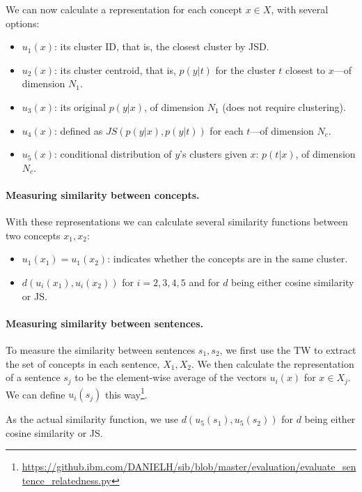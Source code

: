 \documentclass{article}
\begin{document}
    We can now calculate a representation for each concept $x\in X$,
    with several options:
    \begin{itemize}
        \item $u_1(x)$: its cluster ID, that is, the closest cluster by JSD.
        \item $u_2(x)$: its cluster centroid, that is, $p(y|t)$ for the cluster
        $t$ closest to $x$---of dimension $N_1$.
        \item $u_3(x)$: its original $p(y|x)$, of dimension $N_1$ (does not require clustering).
        \item $u_4(x)$: defined as $JS(p(y|x),p(y|t))$ for each $t$---of dimension $N_c$.
        \item $u_5(x)$: conditional distribution of $y$'s clusters given $x$: $p(t|x)$,
        of dimension $N_c$.
    \end{itemize}

    \paragraph{Measuring similarity between concepts.}

    With these representations we can calculate several similarity functions
    between two concepts $x_1,x_2$:
    \begin{itemize}
        \item $u_1(x_1)=u_1(x_2)$:
        indicates whether the concepts are in the same cluster.
        \item $d(u_i(x_1),u_i(x_2))$ for $i=2,3,4,5$ and for $d$ being either
        cosine similarity or JS.
    \end{itemize}


    \paragraph{Measuring similarity between sentences.}

    To measure the similarity between sentences $s_1,s_2$, we first use the TW
    to extract the set of concepts in each sentence, $X_1,X_2$.
    We then calculate the representation of a sentence $s_j$ to be the element-wise average
    of the vectors $u_i(x)$ for $x\in X_j$.
    We can define $u_i(s_j)$ this
    way\footnote{\url{https://github.ibm.com/DANIELH/sib/blob/master/evaluation/evaluate_sentence_relatedness.py}}.

    As the actual similarity function, we use $d(u_5(s_1),u_5(s_2))$ for $d$ being either
    cosine similarity or JS.
\end{document}
